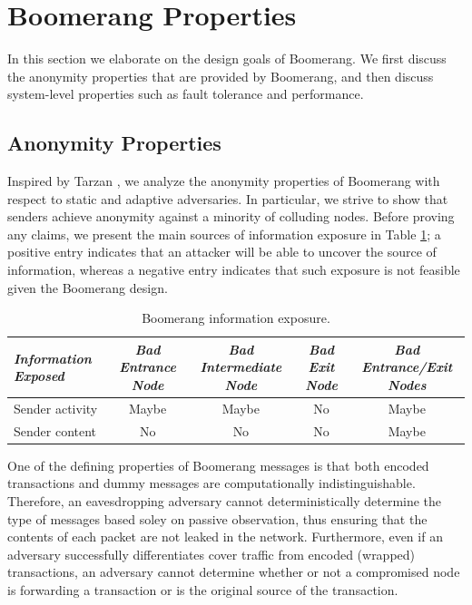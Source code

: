 \section{Boomerang Properties} \label{sec:properties}
In this section we elaborate on the design goals of Boomerang. We first discuss the anonymity properties that are provided by Boomerang, and then discuss system-level properties such as fault tolerance and performance.

\subsection{Anonymity Properties}
Inspired by Tarzan \cite{tarzan}, we analyze the anonymity properties of Boomerang with respect to static and adaptive adversaries. In particular, we strive to show that senders achieve anonymity against a minority of colluding nodes. Before proving any claims, we present the main sources of information exposure in Table \ref{tab:anonymity-properties}; a positive entry indicates that an attacker will be able to uncover the source of information, whereas a negative entry indicates that such exposure is not feasible given the Boomerang design.

\begin{table}[t]
\begin{center}
	\caption {Boomerang information exposure.}
    \label{tab:anonymity-properties}
    \begin{tabular}{|l||c|c|c|c|}
    \hline
    \emph{Information Exposed} & \emph{Bad Entrance Node} & \emph{Bad Intermediate Node} & \emph{Bad Exit Node} & \emph{Bad Entrance/Exit Nodes} \\ \hline \hline
    Sender activity & Maybe    & Maybe & No & Maybe \\ \hline
    Sender content  & No       & No    & No & Maybe \\ \hline
    \end{tabular}
\end{center}
\end{table}

One of the defining properties of Boomerang messages is that both encoded transactions and dummy messages are computationally indistinguishable. Therefore, an eavesdropping adversary cannot deterministically determine the type of messages based soley on passive observation, thus ensuring that the contents of each packet are not leaked in the network. Furthermore, even if an adversary successfully differentiates cover traffic from encoded (wrapped) transactions, an adversary cannot determine whether or not a compromised node is forwarding a transaction or is the original source of the transaction.

